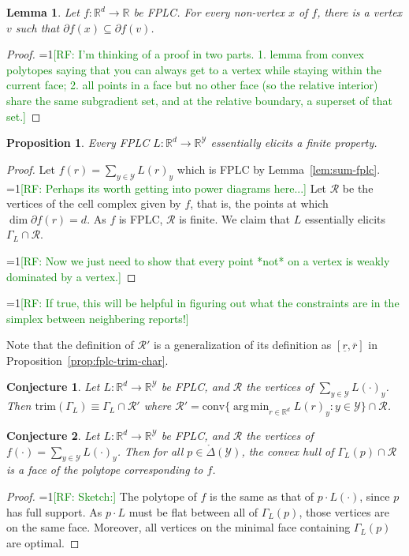 \documentclass[11pt]{article}
\newcommand{\Comments}{1}
\newcommand{\mynote}[2]{\ifnum\Comments=1\textcolor{#1}{#2}\fi}
\newcommand{\raf}[1]{\mynote{green}{[RF: #1]}}
\newcommand{\reals}{\mathbb{R}}
\newcommand{\R}{\mathcal{R}}
\newcommand{\Y}{\mathcal{Y}}
\newcommand{\inter}[1]{\mathring{#1}}%
\newcommand{\trim}{\mathrm{trim}}
\newcommand{\conv}{\mathrm{conv}}
\DeclareMathOperator*{\argmin}{arg\,min}
\newtheorem{lemma}{Lemma}
\newtheorem{proposition}{Proposition}
\newtheorem{conjecture}{Conjecture}
\begin{document}
\begin{lemma}\label{lem:vertiex-subgrad}
  Let $f:\reals^d\to\reals$ be FPLC.
  For every non-vertex $x$ of $f$, there is a vertex $v$ such that $\partial f(x) \subseteq \partial f(v)$.
\end{lemma}
\begin{proof}
  \raf{I'm thinking of a proof in two parts.  1. lemma from convex polytopes saying that you can always get to a vertex while staying within the current face; 2. all points in a face but no other face (so the relative interior) share the same subgradient set, and at the relative boundary, a superset of that set.}
\end{proof}

\begin{proposition}\label{cor:fplc-finite}
  Every FPLC $L : \reals^d \to \reals^\Y$ essentially elicits a finite property.
\end{proposition}
\begin{proof}
  Let $f(r) = \sum_{y\in\Y} L(r)_y$ which is FPLC by Lemma~\ref{lem:sum-fplc}.
  \raf{Perhaps its worth getting into power diagrams here...}
  Let $\R$ be the vertices of the cell complex given by $f$, that is, the points at which $\dim\partial f(r) = d$.
  As $f$ is FPLC, $\R$ is finite.
  We claim that $L$ essentially elicits $\Gamma_L\cap\R$.
  
  \raf{Now we just need to show that every point *not* on a vertex is weakly dominated by a vertex.}
\end{proof}

\raf{If true, this will be helpful in figuring out what the constraints are in the simplex between neighbering reports!}

Note that the definition of $\R'$ is a generalization of its definition as $[\underline r, \overline r]$ in Proposition~\ref{prop:fplc-trim-char}.
\begin{conjecture}
  Let $L:\reals^d \to\reals^\Y$ be FPLC, and $\R$ the vertices of $\sum_{y\in\Y} L(\cdot)_y$.
  Then $\trim(\Gamma_L) \equiv \Gamma_L\cap \R'$ where $\R' = \conv \{ \argmin_{r\in\reals^d} L(r)_y : y\in\Y\} \cap \R$.
\end{conjecture}

\begin{conjecture}
  Let $L:\reals^d \to\reals^\Y$ be FPLC, and $\R$ the vertices of $f(\cdot) = \sum_{y\in\Y} L(\cdot)_y$.
  Then for all $p\in\inter\Delta(\Y)$, the convex hull of $\Gamma_L(p)\cap\R$ is a face of the polytope corresponding to $f$.
\end{conjecture}
\begin{proof}
  \raf{Sketch:}
  The polytope of $f$ is the same as that of $p\cdot L(\cdot)$, since $p$ has full support.  As $p\cdot L$ must be flat between all of $\Gamma_L(p)$, those vertices are on the same face.  Moreover, all vertices on the minimal face containing $\Gamma_L(p)$ are optimal.
\end{proof}
\end{document}
